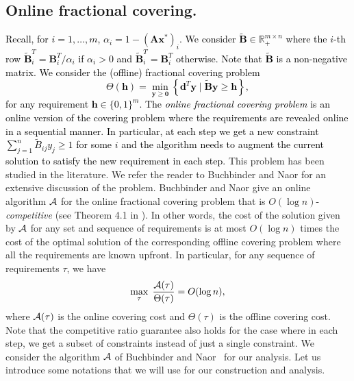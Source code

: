 \documentclass[moor]{informs1}              %
\newcommand{\mb}[1]{\ensuremath{\boldsymbol{#1}}}
\newcommand*{\red}{\textcolor{black}}
\begin{document}
\subsection{Online fractional covering.}
\red{Recall, for $i=1,\ldots,m$,   $\alpha_i = 1 - ( \mb A \mb x^*)_i$. We consider $\tilde{\mb B}  \in \mathbb{R}_+^{m \times n}$  where the $i$-th row $  \mb{\tilde{B}}^T_i = \mb B^T_i / \alpha_i$ if $\alpha_i > 0$ and $  \mb{\tilde{B}}^T_i = \mb B^T_i $ otherwise. Note that $\tilde{\mb B}$ is a non-negative matrix. %
We consider the (offline) fractional covering problem 
$$ \Theta( \mb h) = \min_{\mb y \geq \mb 0} \left\{ \mb d^T \mb y \; \big\vert \; \tilde{ \mb B} \mb y \geq \mb h \right\},$$
for any requirement $\mb h \in \{0,1\}^m$. The \textit{online fractional covering problem} is an online version of the covering problem where the requirements are revealed online in a sequential manner. In particular, at each step we get a new constraint $ \sum_{j=1}^n \tilde{B}_{ij} y_j \geq 1$ for some $i$ and the algorithm needs to augment the current solution to satisfy the new requirement in each step.
}
This problem has been studied in the literature.  We refer the reader to Buchbinder and Naor \cite{buchbinder2009design} for an extensive discussion of the problem. Buchbinder and Naor \cite{buchbinder2009online} give an online algorithm $\cal A$ for the online fractional covering problem that is $O(\log n)$-\textit{competitive} (see Theorem 4.1 in \cite{buchbinder2009online}). In other words, the cost of the solution given by $\cal A$ for any set and sequence of requirements is at most $O(\log n)$ times the  cost of the optimal solution of the corresponding offline covering problem where all the requirements are known upfront. In particular, for any sequence of requirements $\tau$, we have
$$ \max_{\tau} \; \frac{{\cal A}(\tau)}{\Theta(\tau )} =O( \log n),$$ 
where ${\cal A}(\tau)$ is the online covering cost and $\Theta(\tau)$ is the offline covering cost. Note that the competitive ratio guarantee also holds for the case where in each step, we get a subset of constraints instead of just a single constraint. We consider the algorithm $\cal A$ of Buchbinder and Naor~\cite{buchbinder2009online} for our analysis. Let us introduce some notations that we will use for our construction and analysis. 
\end{document}
